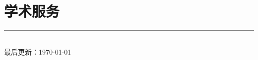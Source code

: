 \documentclass[11pt,a4paper,fontset=none]{ctexart}
\newif\ifshowinvitedtalks
\begin{document}
\ifshowinvitedtalks
  \pdfbookmark[1]{特邀报告}{invited-talks}
  \section*{特邀报告}
  
\fi

\section*{学术服务}


\vfill
\begin{center}
  \rule{0.25\linewidth}{0.4pt}\\[0.5em]
  \small 最后更新：\today
\end{center}
\end{document}
